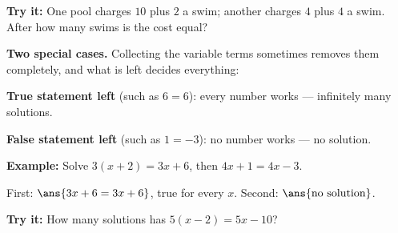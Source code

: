 \documentclass[12pt]{article}
\begin{document}
\begin{tryitbox}
\textbf{Try it:} \quad One pool charges $10$ plus $2$ a swim; another charges $4$ plus $4$
a swim. After how many swims is the cost equal?\\[2pt]
\end{tryitbox}


\begin{formulabox}
\textbf{Two special cases.} Collecting the variable terms sometimes removes them
completely, and what is left decides everything:
\par\smallskip
\textbf{True statement left} (such as $6 = 6$): every number works --- infinitely many
solutions. \par
\textbf{False statement left} (such as $1 = -3$): no number works --- no solution.
\end{formulabox}

\begin{examplebox}
\textbf{Example:} \quad Solve $3(x + 2) = 3x + 6$, then $4x + 1 = 4x - 3$.

First: $\ans{3x + 6 = 3x + 6}$, true for every $x$. \quad
Second: $\ans{\text{no solution}}$.
\end{examplebox}

\begin{tryitbox}
\textbf{Try it:} \quad How many solutions has $5(x - 2) = 5x - 10$?\\[2pt]
\end{tryitbox}
\end{document}
